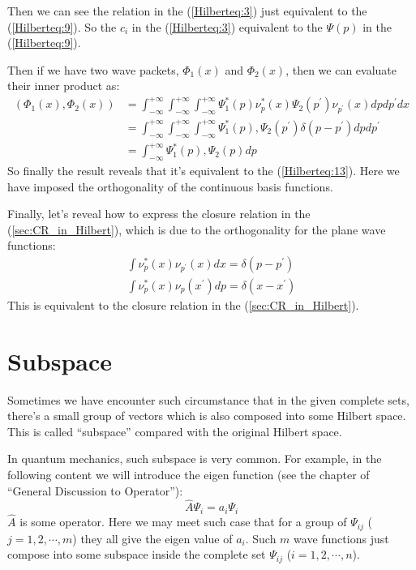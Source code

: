 Then we can see the relation in the (\ref{Hilberteq:3}) just
equivalent to the (\ref{Hilberteq:9}). So the $c_{i}$ in the
(\ref{Hilberteq:3}) equivalent to the $\Psi(p)$ in the
(\ref{Hilberteq:9}).

Then if we have two wave packets, $\Phi_{1}(x)$ and $\Phi_{2}(x)$,
then we can evaluate their inner product as:
\begin{align}
  \label{Hilberteq:12}
  (\Phi_{1}(x), \Phi_{2}(x)) &= \int_{-\infty}^{+\infty}
  \int_{-\infty}^{+\infty}\int_{-\infty}^{+\infty}
  \Psi^{*}_{1}(p)\nu^{*}_{p}(x)\Psi_{2}(p^{'})\nu_{p^{'}}(x)dpdp^{'}dx
  \nonumber \\
  &= \int_{-\infty}^{+\infty}
  \int_{-\infty}^{+\infty}\int_{-\infty}^{+\infty}
  \Psi^{*}_{1}(p), \Psi_{2}(p^{'})\delta(p-p^{'})dpdp^{'}
  \nonumber \\
  &= \int_{-\infty}^{+\infty}\Psi^{*}_{1}(p), \Psi_{2}(p)dp
\end{align}
So finally the result reveals that it's equivalent to the
(\ref{Hilberteq:13}). Here we have imposed the orthogonality of the
continuous basis functions.

Finally, let's reveal how to express the closure relation in the
(\ref{sec:CR_in_Hilbert}), which is due to the orthogonality for the
plane wave functions:
\begin{align}
  \label{Hilberteq:14}
\int \nu_{p}^{*}(x)\nu_{p^{'}}(x)dx = \delta(p - p^{'}) \nonumber \\
\int \nu_{p}^{*}(x)\nu_{p}(x^{'})dp = \delta(x - x^{'})
\end{align}
This is equivalent to the closure relation in the
(\ref{sec:CR_in_Hilbert}).




\section{Subspace}
%
%
%
Sometimes we have encounter such circumstance that in the given
complete sets, there's a small group of vectors which is also
composed into some Hilbert space. This is called ``subspace''
compared with the original Hilbert space.

In quantum mechanics, such subspace is very common. For example, in
the following content we will introduce the eigen function (see the
chapter of ``General Discussion to Operator''):
\begin{equation}\label{}
\hat{A}\Psi_{i} = a_{i}\Psi_{i}
\end{equation}
$\hat{A}$ is some operator. Here we may meet such case that for a
group of $\Psi_{ij}$ ($j=1,2, \cdots, m$) they all give the eigen
value of $a_{i}$. Such $m$ wave functions just compose into some
subspace inside the complete set $\Psi_{ij}$ ($i=1,2,\cdots, n$).

